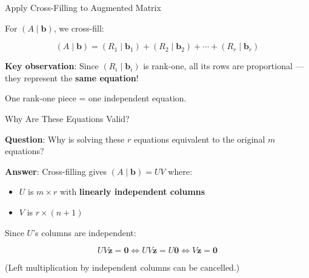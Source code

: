 \documentclass[10pt]{beamer}
\theoremstyle{definition}
\newcommand{\x}[1]{\alert{\textbf{#1}}}
\begin{document}
\begin{frame}{Apply Cross-Filling to Augmented Matrix}

For $(A \mid \mathbf{b})$, we cross-fill:

$$(A \mid \mathbf{b}) = (R_1 \mid \mathbf{b}_1) + (R_2 \mid \mathbf{b}_2) + \cdots + (R_r \mid \mathbf{b}_r)$$

\vspace{1em}

\x{Key observation}: Since $(R_i \mid \mathbf{b}_i)$ is rank-one, all its rows are proportional — they represent the \x{same equation}!

\vspace{1em}

One rank-one piece = one independent equation.

\end{frame}

\begin{frame}{Why Are These Equations Valid?}

\x{Question}: Why is solving these $r$ equations equivalent to the original $m$ equations?

\vspace{1em}

\x{Answer}: Cross-filling gives $(A \mid \mathbf{b}) = UV$ where:
\begin{itemize}
\item $U$ is $m \times r$ with \textbf{linearly independent columns}
\item $V$ is $r \times (n+1)$
\end{itemize}

\vspace{0.5em}

Since $U$'s columns are independent:

$$UV\mathbf{z} = \mathbf{0} \iff UV\mathbf{z} = U\mathbf{0} \iff V\mathbf{z} = \mathbf{0}$$

\vspace{0.5em}

(Left multiplication by independent columns can be cancelled.)

\end{frame}
\end{document}
